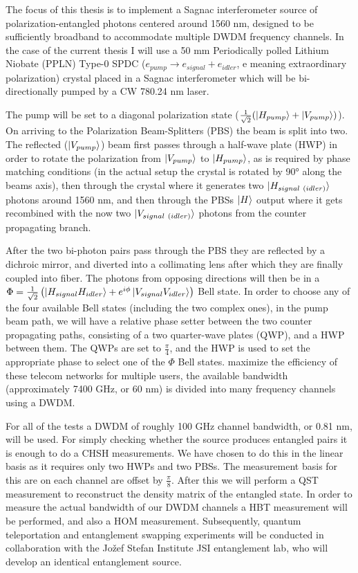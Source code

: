 \documentclass{article}
\theoremstyle{mytheoremstyle}
\theoremstyle{mytheoremstyle}
\theoremstyle{myproblemstyle}
\begin{document}
The focus of this thesis is to implement a Sagnac interferometer source of polarization-entangled photons centered around 1560 nm,
designed to be sufficiently broadband to accommodate multiple DWDM frequency channels.
In the case of the current thesis I will use a 50 mm Periodically polled Lithium Niobate (PPLN)
Type-0 SPDC ($e_{pump} \rightarrow e_{signal} + e_{idler}$,
e meaning extraordinary polarization) crystal placed in a Sagnac interferometer
which will be bi-directionally pumped by a CW 780.24 nm laser.
\par The pump will be set to a diagonal polarization state ($\frac{1}{\sqrt{2}}(\ket{H_{pump}} + \ket{V_{pump}})$). On arriving to the
Polarization Beam-Splitters (PBS) the beam is split into two. The reflected ($\ket{V_{pump}}$) beam first passes through a half-wave plate (HWP) in order to rotate the
polarization from $\ket{V_{pump}}$ to $\ket{H_{pump}}$, as is required by phase matching conditions (in the actual setup the crystal is rotated by 90° along the beams axis), then through
the crystal where it generates two $\ket{H_{signal\ (idler)}}$ photons around 1560 nm, and then through the PBSs $\ket{H}$ output where it gets recombined
with the now two $\ket{V_{signal\ (idler)}}$ photons from the counter propagating branch.

After the two bi-photon pairs pass through the PBS they are reflected by a dichroic mirror, and diverted into a collimating lens
after which they are finally coupled into fiber. The photons from opposing directions will then be in a
$\Phi = \frac{1}{\sqrt{2}}\left( \ket{H_{signal}H_{idler}} + e^{i \phi}\ket{V_{signal}V_{idler}}\right)$ Bell state.
In order to choose any of the four available Bell states (including the two complex ones), in the pump beam path, we will have
a relative phase setter between the two counter propagating paths, consisting of a two quarter-wave plates (QWP), and a HWP between them.
The QWPs are set to $\frac{\pi}{4}$, and the HWP is used to set the appropriate phase to select one of the $\Phi$ Bell states.
\parTo maximize the efficiency of these telecom networks for multiple users, the available bandwidth (approximately 7400 GHz, or 60 nm)
is divided into many frequency channels using a DWDM.

For all of the tests a DWDM of roughly 100 GHz channel bandwidth, or 0.81 nm, will be used. For simply checking whether the source
produces entangled pairs it is enough to do a CHSH measurements. We have chosen to do this in the linear basis as it requires
only two HWPs and two PBSs. The measurement basis for this are on each channel are offset by $\frac{\pi}{8}$. After this
we will perform a QST measurement to reconstruct \cite{James_Kwiat_Munro_White_2001} the density matrix of the entangled state.
In order to measure the actual bandwidth of our DWDM channels a HBT measurement will be performed, and also a HOM measurement.
Subsequently, quantum teleportation \cite{Bouwmeester_Pan_Mattle_Eibl_Weinfurter_Zeilinger_1997}
and entanglement swapping \cite{Jennewein_Weihs_Pan_Zeilinger_2001} experiments will be conducted in collaboration with the Jožef Stefan Institute JSI
entanglement lab, who will develop an identical entanglement source.
\end{document}
